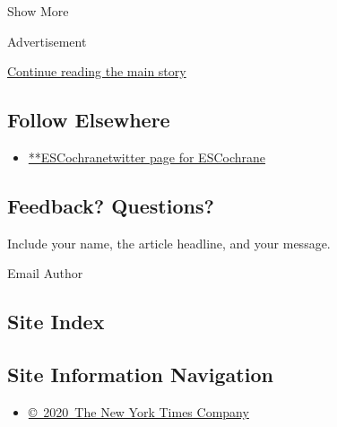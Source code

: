 Show More

Advertisement

\protect\hyperlink{after-mid2}{Continue reading the main story}

\hypertarget{follow-elsewhere}{%
\subsection{Follow Elsewhere}\label{follow-elsewhere}}

\begin{itemize}
\tightlist
\item
  \href{https://twitter.com/ESCochrane}{**ESCochranetwitter page for
  ESCochrane}
\end{itemize}

\hypertarget{feedback-questions}{%
\subsection{Feedback? Questions?}\label{feedback-questions}}

Include your name, the article headline, and your message.

Email Author

\hypertarget{site-index}{%
\subsection{Site Index}\label{site-index}}

\hypertarget{site-information-navigation}{%
\subsection{Site Information
Navigation}\label{site-information-navigation}}

\begin{itemize}
\tightlist
\item
  \href{https://help.nytimes.com/hc/en-us/articles/115014792127-Copyright-notice}{©~2020~The
  New York Times Company}
\end{itemize}

